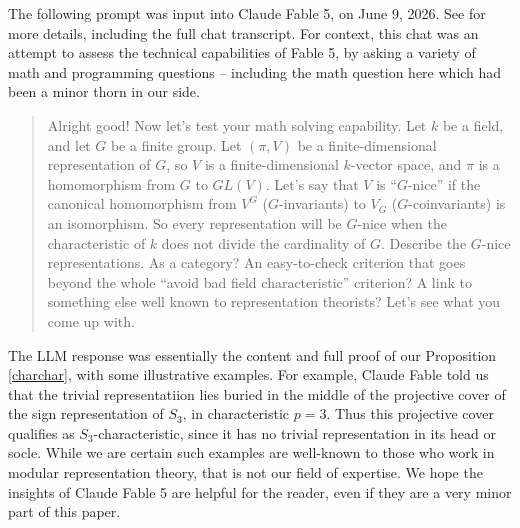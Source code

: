 \documentclass[letter]{amsart}
\theoremstyle{definition}
\theoremstyle{remark}
\numberwithin{thm}{section}
\numberwithin{equation}{section}
\begin{document}
The following prompt was input into Claude Fable 5, on June 9, 2026.  See \cite{Claude} for more details, including the full chat transcript.  For context, this chat was an attempt to assess the technical capabilities of Fable 5, by asking a variety of math and programming questions -- including the math question here which had been a minor thorn in our side.
\begin{quote}
Alright good!  Now let's test your math solving capability.  Let $k$ be a field, and let $G$ be a finite group.  Let $(\pi, V)$ be a finite-dimensional representation of $G$, so $V$ is a finite-dimensional $k$-vector space, and $\pi$ is a homomorphism from $G$ to $GL(V)$.  Let's say that $V$ is ``$G$-nice'' if the canonical homomorphism from $V^G$ ($G$-invariants) to $V_G$ ($G$-coinvariants) is an isomorphism.  So every representation will be $G$-nice when the characteristic of $k$ does not divide the cardinality of $G$.  Describe the $G$-nice representations.  As a category?  An easy-to-check criterion that goes beyond the whole ``avoid bad field characteristic'' criterion?  A link to something else well known to representation theorists?  Let's see what you come up with.
\end{quote}

The LLM response was essentially the content and full proof of our Proposition \ref{charchar}, with some illustrative examples.  For example, Claude Fable told us that the trivial representatiion lies buried in the middle of the projective cover of the sign representation of $S_3$, in characteristic $p=3$.  Thus this projective cover qualifies as $S_3$-characteristic, since it has no trivial representation in its head or socle.  While we are certain such examples are well-known to those who work in modular representation theory, that is not our field of expertise.  We hope the insights of Claude Fable 5 are helpful for the reader, even if they are a very minor part of this paper.



\end{document}
